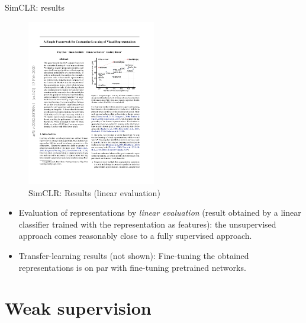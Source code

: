 \documentclass[xcolor=pdftex,dvipsnames,table]{beamer}
\begin{document}
\begin{frame}{SimCLR: results}
\begin{figure}[htb]
   \centering
   \includegraphics[width=0.5\textwidth]{../graphics/simclr_benchmark.pdf}
   \caption{SimCLR: Results (linear evaluation) \cite{Chen2020}}
\end{figure}
\begin{itemize}
\item Evaluation of representations by \emph{linear evaluation} (result obtained by a linear classifier trained with the representation as features): the unsupervised approach comes reasonably close to a fully supervised approach. 
\item Transfer-learning results (not shown): Fine-tuning the obtained representations is on par with fine-tuning pretrained networks. 
\end{itemize}
\end{frame}

\section{Weak supervision}
\end{document}

